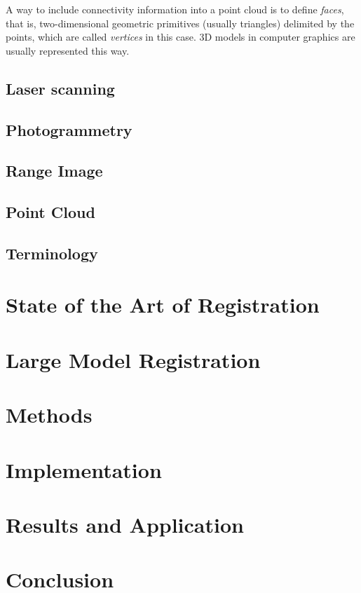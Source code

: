 \documentclass[a4paper,10pt]{scrreprt}
\begin{document}
A way to include connectivity information into a point cloud is to define \emph{faces}, that is, two-dimensional geometric primitives (usually triangles) delimited by the points, which are called \emph{vertices} in this case. 3D models in computer graphics are usually represented this way.


 



\section{Laser scanning}

\section{Photogrammetry}

\section{Range Image}

\section{Point Cloud}

\section{Terminology}

\chapter{State of the Art of Registration}

\chapter{Large Model Registration}

\chapter{Methods}

\chapter{Implementation}

\chapter{Results and Application}

\chapter{Conclusion}


\nocite{*}

\end{document}
